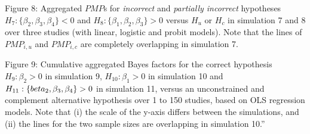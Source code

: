 \documentclass[
]{interact}
\begin{document}
Figure 8: Aggregated \(PMP\)s for \textit{incorrect} and
\textit{partially incorrect} hypotheses
\(H_7: \{\beta_2, \beta_3, \beta_4\} < 0\) and
\(H_8: \{\beta_1, \beta_2, \beta_3\} > 0\) versus \(H_u\) or \(H_c\) in
simulation 7 and 8 over three studies (with linear, logistic and probit
models). Note that the lines of \(PMP_{i,u}\) and \(PMP_{i,c}\) are
completely overlapping in simulation 7.

Figure 9: Cumulative aggregated Bayes factors for the correct hypothesis
\(H_9: \beta_2 > 0\) in simulation 9, \(H_{10}: \beta_1 > 0\) in
simulation 10 and \(H_{11}: \{\\beta_2, \beta_3, \beta_4\} > 0\) in
simulation 11, versus an unconstrained and complement alternative
hypothesis over 1 to 150 studies, based on OLS regression models. Note
that (i) the scale of the y-axis differs between the simulations, and
(ii) the lines for the two sample sizes are overlapping in simulation
10.''
\end{document}
